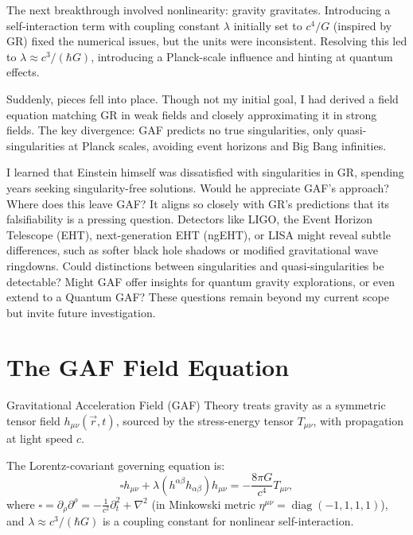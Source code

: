 \documentclass{article}
\begin{document}
The next breakthrough involved nonlinearity: gravity gravitates. Introducing a self-interaction term with coupling constant \( \lambda \) initially set to \( c^4 / G \) (inspired by GR) fixed the numerical issues, but the units were inconsistent. Resolving this led to \( \lambda \approx c^3 / (\hbar G) \), introducing a Planck-scale influence and hinting at quantum effects.

Suddenly, pieces fell into place. Though not my initial goal, I had derived a field equation matching GR in weak fields and closely approximating it in strong fields. The key divergence: GAF predicts no true singularities, only quasi-singularities at Planck scales, avoiding event horizons and Big Bang infinities.

I learned that Einstein himself was dissatisfied with singularities in GR, spending years seeking singularity-free solutions. Would he appreciate GAF's approach? Where does this leave GAF? It aligns so closely with GR's predictions that its falsifiability is a pressing question. Detectors like LIGO, the Event Horizon Telescope (EHT), next-generation EHT (ngEHT), or LISA might reveal subtle differences, such as softer black hole shadows or modified gravitational wave ringdowns. Could distinctions between singularities and quasi-singularities be detectable? Might GAF offer insights for quantum gravity explorations, or even extend to a Quantum GAF? These questions remain beyond my current scope but invite future investigation.








\newpage
\section{The GAF Field Equation}

Gravitational Acceleration Field (GAF) Theory treats gravity as a symmetric tensor field $ h_{\mu\nu}(\vec{r}, t) $, sourced by the stress-energy tensor $ T_{\mu\nu} $, with propagation at light speed $ c $. 

The Lorentz-covariant governing equation is:
$$\square h_{\mu\nu} + \lambda (h^{\alpha\beta} h_{\alpha\beta}) h_{\mu\nu} = -\frac{8\pi G}{c^4} T_{\mu\nu},$$
where $ \square = \partial_\rho \partial^\rho = -\frac{1}{c^2} \partial_t^2 + \nabla^2 $ (in Minkowski metric $ \eta^{\mu\nu} = \operatorname{diag}(-1,1,1,1) $), and $\lambda \approx c^3 / (\hbar G)$ is a coupling constant for nonlinear self-interaction.  
\end{document}
